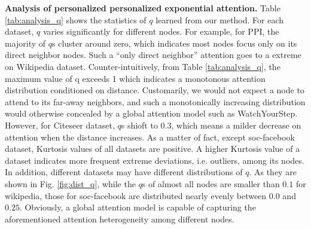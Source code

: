 \documentclass{article}
\begin{document}
\textbf{Analysis of personalized personalized exponential attention.} 
Table \ref{tab:analysis_q} shows the statistics of $q$ learned from our method. For each dataset, $q$ varies significantly for different nodes. For example, for PPI, the majority of $q$s cluster around zero, which indicates most nodes focus only on its direct neighbor nodes. Such a ``only direct neighbor'' attention goes to a extreme on Wikipedia dataset. Counter-intuitively, from Table \ref{tab:analysis_q}, the maximum value of q exceeds 1 which indicates a monotonous attention distribution conditioned on distance. Customarily, we would not expect a node to attend to its far-away neighbors, and such a monotonically increasing distribution would otherwise concealed by a global attention model such as WatchYourStep.
However, for Citeseer dataset, $q$s shioft to 0.3, which means a milder decrease on attention when the distance increases.
As a matter of fact, except soc-facebook dataset, Kurtosis values of all datasets are positive. A higher Kurtosis value of a dataset indicates more frequent extreme deviations, i.e. outliers, among its nodes.
In addition, different datasets may have different distributions of $q$. As they are shown in Fig. \ref{fig:dist_q}, while the $q$s of almost all nodes are smaller than $0.1$ for wikipedia, those for soc-facebook are distributed nearly evenly between $0.0$ and $0.25$. Obviously, a global attention model is capable of capturing the aforementioned attention heterogeneity among different nodes.
\end{document}
